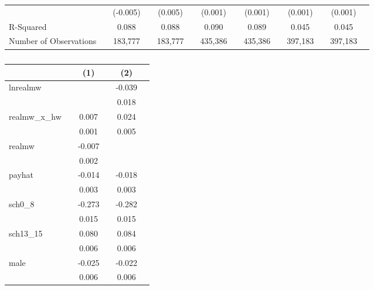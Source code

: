 \documentclass{article}
\begin{document}
\begin{landscape}
\begin{table}[ht]
\begin{tabular}{llclclclclclcl}
                       &  & (-0.005)    &     & (0.005)      &  & (0.001)        &      & (0.001)        &  & (0.001)        &     & (0.001)       &  \\
R-Squared              &  & 0.088          &     & 0.088         &  & 0.090           &      & 0.089          &  & 0.045          &     & 0.045          &  \\
Number of Observations &  & 183,777         &     & 183,777        &  & 435,386          &      & 435,386         &  & 397,183         &     & 397,183         & \\
\hline
\end{tabular}
\end{table}
\end{landscape}

\begin{table}[ht]
\centering
\caption{}
\label{my-label}
\begin{tabular}{llclcl}
\hline
                       &  & (1) &            & (2) &  \\
\hline
lnrealmw               &  &              &            & -0.039   &    \\
                       &  &              &            & 0.018     &    \\
realmw\_x\_hw          &  & 0.007         &            & 0.024     & \\
                       &  & 0.001        &            & 0.005    &   \\
realmw                 &  & -0.007        &            &              &  \\
                       &  & 0.002        &            &              & \\
payhat                 &  & -0.014       &            & -0.018    &   \\
                       &  & 0.003         &            & 0.003    &   \\
sch0\_8                &  & -0.273       &            & -0.282    &  \\
                       &  & 0.015        &            & 0.015     &   \\
sch13\_15              &  & 0.080     &            & 0.084     &  \\
                       &  & 0.006    &            & 0.006     &   \\
male                   &  & -0.025    &            & -0.022    &  \\
                       &  & 0.006    &            & 0.006     &  \\

\end{tabular}
\end{table}
\end{document}
